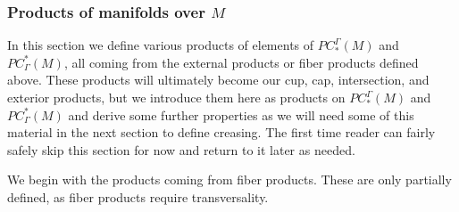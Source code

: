 \subsubsection{Products of manifolds over \texorpdfstring{$M$}{M}}

In this section we define various products of elements of $PC_*^\Gamma(M)$ and $PC^*_\Gamma(M)$, all coming from the external products or fiber products defined above.
These products will ultimately become our cup, cap, intersection, and exterior products, but we introduce them here as products on $PC_*^\Gamma(M)$ and $PC^*_\Gamma(M)$ and derive some further properties as we will need some of this material in the next section to define creasing.
The first time reader can fairly safely skip this section for now and return to it later as needed.

We begin with the products coming from fiber products. 
These are only partially defined, as fiber products require transversality.

